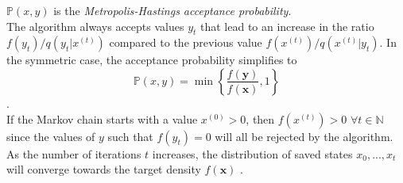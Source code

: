 $\mathbb{P}\left(x,y\right)$ is the \textit{Metropolis-Hastings acceptance probability}. \\
The algorithm always accepts values $y_t$ that lead to an increase in the ratio $f\left(y_t\right)/q\left(y_t|x^{(t)}\right)$ compared to the previous value $f\left(x^{(t)}\right)/q\left(x^{(t)}|y_t\right)$. In the symmetric case, the acceptance probability simplifies to
\begin{equation*}
     \mathbb{P}\left(x,y\right) = \min\left\lbrace\frac{f\left(\pmb{y}\right)}{f\left(\pmb{x}\right)}, 1\right\rbrace
\end{equation*}
\autocite[][]{hastings1970monte}. \\
If the Markov chain starts with a value $x^{(0)} > 0$, then $f\left(x^{(t)}\right) > 0\,\,\forall t\in\mathbb{N}$ since the values of $y$ such that $f\left(y_t\right) = 0$ will all be rejected by the algorithm. As the number of iterations $t$ increases, the distribution of saved states $x_0,...,x_t$ will converge towards the target density $f(\pmb{x})$ \autocite[][270--275]{robert2013monte}.

